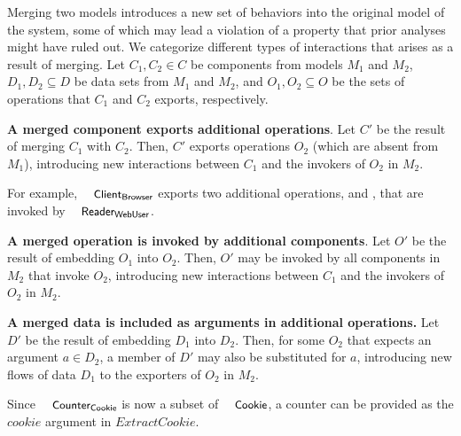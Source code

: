Merging two models introduces a new set of behaviors into
the original model of the system, some of which may lead a violation
of a property that prior analyses might have ruled out. We categorize
different types of interactions that arises as a result of
merging. Let $C_1, C_2 \in C$ be components from models $M_1$ and
$M_2$, $D_1, D_2 \subseteq D$ be data sets from $M_1$ and $M_2$, and
$O_1, O_2 \subseteq O$ be the sets of operations that $C_1$ and $C_2$
exports, respectively. 

\textbf{A merged component exports additional operations}. Let $C'$ be
the result of merging $C_1$ with $C_2$. Then, $C'$ exports operations
$O_2$ (which are absent from $M_1$), introducing new interactions
between $C_1$ and the invokers of $O_2$ in $M_2$. 

For example, $\txtcname{Client}_\textsf{Browser}$ exports two additional
operations,  and , that are
invoked by $\txtcname{Reader}_\textsf{WebUser}$.

\textbf{A merged operation is invoked by additional components}. Let $O'$
be the result of embedding $O_1$ into $O_2$. Then, $O'$ may be invoked
by all components in $M_2$ that invoke $O_2$, introducing new interactions
between $C_1$ and the invokers of $O_2$ in $M_2$.

\textbf{A merged data is included as arguments in additional
  operations.}  Let $D'$ be the result of embedding $D_1$ into
$D_2$. Then, for some $O_2$ that expects an argument $a \in D_2$,
a member of $D'$ may also be substituted for $a$, introducing new
flows of data $D_1$ to the exporters of $O_2$ in $M_2$.

Since $\txtcname{Counter}_\textsf{Cookie}$ is now a
subset of $\txtcname{Cookie}$, a counter can be provided as the $cookie$
argument in $ExtractCookie$.



